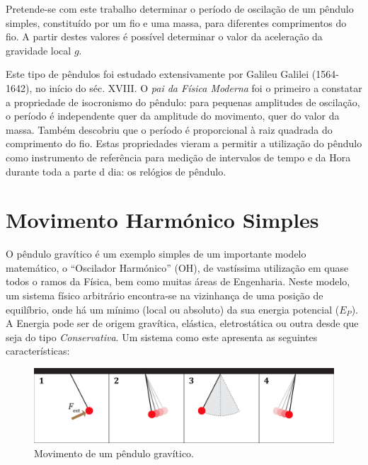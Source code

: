 \documentclass[a4paper,twoside,12pt]{article}      %
\begin{document}
Pretende-se com este trabalho determinar o período de oscilação de um pêndulo simples, constituído por um fio e uma massa, para diferentes comprimentos do fio. A partir destes valores é possível determinar o valor da aceleração da gravidade local $g$.

Este tipo de pêndulos foi estudado extensivamente por Galileu Galilei (1564-1642), no início do séc. XVIII. O \emph{pai da Física Moderna} foi o primeiro a constatar a propriedade de isocronismo do pêndulo: para pequenas amplitudes de oscilação, o período é independente quer da amplitude do movimento, quer do valor da massa. Também descobriu que o período é proporcional à raiz quadrada do comprimento do fio. Estas propriedades vieram a permitir a utilização do pêndulo como instrumento de referência para medição de intervalos de tempo e da Hora durante toda a parte d dia: os relógios de pêndulo.


\section{\sf Movimento Harmónico Simples}

O pêndulo gravítico é um exemplo simples de um importante modelo matemático, o ``Oscilador Harmónico'' (OH), de vastíssima utilização em quase todos o ramos da Física,
 bem como muitas áreas de Engenharia. 
 Neste modelo, um sistema físico arbitrário encontra-se na vizinhança de uma posição de equilíbrio, onde há um mínimo (local ou absoluto) da sua energia potencial  ($E_P$). A Energia pode ser de origem gravítica, elástica, eletrostática ou outra desde que seja do tipo \emph{Conservativa}. Um sistema como este apresenta as seguintes características:

\begin{figure}
	[b] \centering 
	\includegraphics[width=0.9	\textwidth]{Fig-1} 
	\caption{Movimento de um pêndulo gravítico.  \label{fig:1}} 
\end{figure}
 
\end{document}

